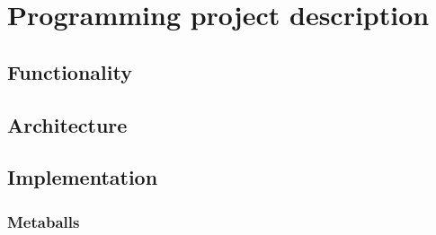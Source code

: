 \chapter{Programming project description}
\section{Functionality}
\section{Architecture}
\section{Implementation}
\subsection{Metaballs}
